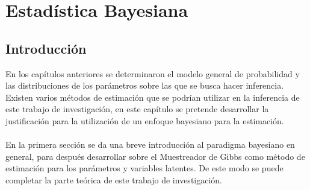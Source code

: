 \chapter{Estad\'istica Bayesiana}
\section{Introducci\'on}
En los cap\'itulos anteriores se determinaron el modelo general de probabilidad y las distribuciones de los par\'ametros sobre las que se busca hacer inferencia. Existen varios m\'etodos de estimaci\'on que se podr\'ian utilizar en la inferencia de este trabajo de investigaci\'on, en este cap\'itulo se pretende desarrollar la justificaci\'on para la utilizaci\'on de un enfoque bayesiano para la estimaci\'on.\\
\\
En la primera secci\'on se da una breve introducci\'on al paradigma bayesiano en general, para despu\'es desarrollar sobre el Muestreador de Gibbs como m\'etodo de estimaci\'on para los par\'ametros y variables latentes. De este modo se puede completar la parte te\'orica de este trabajo de investigaci\'on.  
